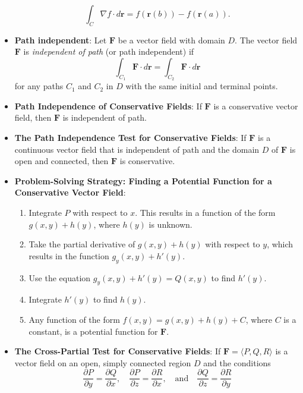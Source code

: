 \documentclass{report}
\begin{document}
\begin{itemize}
            \[
                \int_C \nabla f \cdot d\mathbf{r} = f(\mathbf{r}(b)) - f(\mathbf{r}(a)).
            \]
        \item \textbf{Path independent}:
            Let \( \mathbf{F} \) be a vector field with domain \( D \). The vector field \( \mathbf{F} \) is \textit{independent of path} (or path independent) if 
            \[
                \int_{C_1} \mathbf{F} \cdot d\mathbf{r} = \int_{C_2} \mathbf{F} \cdot d\mathbf{r}
            \]
            for any paths \( C_1 \) and \( C_2 \) in \( D \) with the same initial and terminal points.
        \item \textbf{Path Independence of Conservative Fields}:
            If $\mathbf{F}$ is a conservative vector field, then $\mathbf{F}$ is independent of path.

        \item \textbf{The Path Independence Test for Conservative Fields}:
            If $\mathbf{F}$ is a continuous vector field that is independent of path and the domain $D$ of $\mathbf{F}$ is open and connected, then $\mathbf{F}$ is conservative.
        \item \textbf{Problem-Solving Strategy: Finding a Potential Function for a Conservative Vector Field}:
            \begin{enumerate}
                \item Integrate \( P \) with respect to \( x \). This results in a function of the form \( g(x,y) + h(y) \), where \( h(y) \) is unknown.
                \item Take the partial derivative of \( g(x,y) + h(y) \) with respect to \( y \), which results in the function \( g_y(x,y) + h'(y) \).
                \item Use the equation \( g_y(x,y) + h'(y) = Q(x,y) \) to find \( h'(y) \).
                \item Integrate \( h'(y) \) to find \( h(y) \).
                \item Any function of the form \( f(x,y) = g(x,y) + h(y) + C \), where \( C \) is a constant, is a potential function for \( \mathbf{F} \).
            \end{enumerate}
        \item \textbf{The Cross-Partial Test for Conservative Fields}:
            If \( \mathbf{F} = \langle P, Q, R \rangle \) is a vector field on an open, simply connected region \( D \) and the conditions 
            \[
                \frac{\partial P}{\partial y} = \frac{\partial Q}{\partial x}, \quad \frac{\partial P}{\partial z} = \frac{\partial R}{\partial x}, \quad \text{and} \quad \frac{\partial Q}{\partial z} = \frac{\partial R}{\partial y}
\]
\end{itemize}
\end{document}
